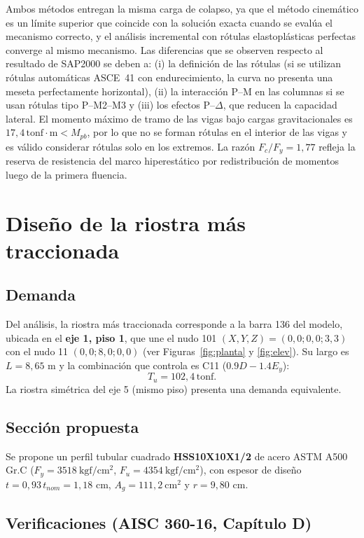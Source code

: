 \documentclass[11pt,letterpaper]{article}
\newcommand{\tonf}{\,\mathrm{tonf}}
\newcommand{\tonfm}{\,\mathrm{tonf\cdot m}}
\begin{document}
Ambos métodos entregan la misma carga de colapso, ya que el método cinemático es un límite superior que
coincide con la solución exacta cuando se evalúa el mecanismo correcto, y el análisis incremental con
rótulas elastoplásticas perfectas converge al mismo mecanismo. Las diferencias que se observen respecto al
resultado de SAP2000 se deben a: (i) la definición de las rótulas (si se utilizan rótulas automáticas
ASCE~41 con endurecimiento, la curva no presenta una meseta perfectamente horizontal), (ii) la
interacción P--M en las columnas si se usan rótulas tipo P--M2--M3 y (iii) los efectos P--$\Delta$,
que reducen la capacidad lateral. El momento máximo de tramo de las vigas bajo cargas gravitacionales es
$17{,}4\tonfm < M_{pb}$, por lo que no se forman rótulas en el interior de las vigas
y es válido considerar rótulas solo en los extremos.
La razón $F_c/F_y = 1{,}77$ refleja la reserva de resistencia del
marco hiperestático por redistribución de momentos luego de la primera fluencia.

\section{Diseño de la riostra más traccionada}

\subsection{Demanda}
Del análisis, la riostra más traccionada corresponde a la barra 136 del modelo,
ubicada en el \textbf{eje 1, piso 1}, que une el nudo 101
$(X,Y,Z) = (0{,}0;0{,}0;3{,}3)$ con el nudo 11
$(0{,}0;8{,}0;0{,}0)$ (ver Figuras~\ref{fig:planta} y \ref{fig:elev}).
Su largo es $L = 8{,}65$ m y la combinación que controla es C11 ($0.9D - 1.4E_y$):
\[
T_u = 102{,}4\tonf .
\]
La riostra simétrica del eje 5 (mismo piso) presenta una demanda equivalente.

\subsection{Sección propuesta}
Se propone un perfil tubular cuadrado \textbf{HSS10X10X1/2} de acero ASTM A500 Gr.C
($F_y = 3518\ \mathrm{kgf/cm^2}$, $F_u = 4354\ \mathrm{kgf/cm^2}$), con espesor de diseño $t = 0{,}93\,t_{nom} = 1{,}18$ cm, $A_g = 111{,}2\ \mathrm{cm^2}$ y
$r = 9{,}80$ cm.

\subsection{Verificaciones (AISC 360-16, Capítulo D)}
\end{document}
